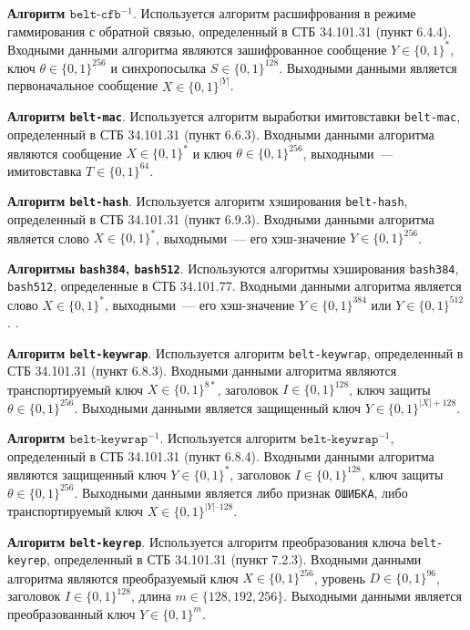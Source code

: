 {\bf Алгоритм $\texttt{belt-cfb}^{-1}$}.
Используется алгоритм расшифрования в режиме 
гаммирования с обратной связью, определенный в СТБ 34.101.31 (пункт 
6.4.4). Входными данными алгоритма являются зашифрованное 
сообщение $Y\in\{0,1\}^*$, ключ $\theta\in\{0,1\}^{256}$ 
и синхропосылка $S\in\{0,1\}^{128}$. Выходными 
данными является первоначальное сообщение $X\in\{0,1\}^{|Y|}$.

{\bf Алгоритм \texttt{belt-mac}}.
Используется алгоритм выработки имитовставки \texttt{belt-mac}, 
определенный в СТБ 34.101.31 (пункт 6.6.3). Входными данными алгоритма 
являются сообщение $X\in\{0,1\}^*$ и ключ $\theta\in\{0,1\}^{256}$, 
выходными~--- имитовставка $T\in\{0,1\}^{64}$.

{\bf Алгоритм \texttt{belt-hash}}.
Используется алгоритм хэширования \texttt{belt-hash},
определенный в СТБ 34.101.31 (пункт 6.9.3). Входными данными алгоритма 
является слово $X\in\{0,1\}^*$, выходными~--- 
его хэш-значение $Y\in\{0,1\}^{256}$.

{\bf Алгоритмы \texttt{bash384}, \texttt{bash512}}.
Используются алгоритмы хэширования \texttt{bash384}, \texttt{bash512},
определенные в СТБ 34.101.77. Входными данными алгоритма 
является слово $X\in\{0,1\}^*$, выходными~--- 
его хэш-значение $Y\in\{0,1\}^{384}$ или $Y\in\{0,1\}^{512}$.
%
.

{\bf Алгоритм \texttt{belt-keywrap}}.
Используется алгоритм \texttt{belt-keywrap}, определенный в 
СТБ 34.101.31 (пункт 6.8.3). Входными данными алгоритма являются 
транспортируемый ключ $X\in\{0,1\}^{8*}$, 
заголовок $I\in\{0,1\}^{128}$, ключ защиты $\theta\in\{0,1\}^{256}$.
Выходными данными является защищенный ключ $Y\in\{0,1\}^{|X|+128}$.

{\bf Алгоритм $\texttt{belt-keywrap}^{-1}$}.
Используется алгоритм $\texttt{belt-keywrap}^{-1}$, определенный 
в СТБ 34.101.31 (пункт 6.8.4). Входными данными алгоритма являются 
защищенный ключ $Y\in\{0,1\}^*$, заголовок $I\in\{0,1\}^{128}$, 
ключ защиты $\theta\in\{0,1\}^{256}$. Выходными данными является либо признак 
\texttt{ОШИБКА}, либо транспортируемый ключ $X\in\{0,1\}^{|Y|–128}$.

{\bf Алгоритм \texttt{belt-keyrep}}.
Используется алгоритм преобразования ключа 
\texttt{belt-keyrep}, определенный в СТБ 34.101.31 (пункт 7.2.3).
Входными данными алгоритма являются преобразуемый ключ $X\in\{0,1\}^{256}$, 
уровень $D\in\{0,1\}^{96}$, заголовок $I\in\{0,1\}^{128}$, 
длина $m\in\{128,192,256\}$. Выходными данными 
является преобразованный ключ $Y\in\{0,1\}^{m}$.


